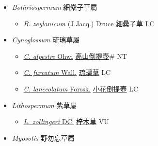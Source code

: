 
  \begin{itemize}
 \item[] \textit{Bothriospermum} 細纍子草屬
                    
  \begin{itemize}
        \item[] \href{http://www.theplantlist.org/tpl1.1/search?q=Bothriospermum+zeylanicum}{\textit{B. zeylanicum} (J.Jacq.) Druce}   \href{\detokenize{http://taibnet.sinica.edu.tw/chi/taibnet_species_list.php?T2=細纍子草&T2_new_value=true&fr=y}}{細纍子草} LC
  \end{itemize}
 \item[] \textit{Cynoglossum} 琉璃草屬
                    
  \begin{itemize}
        \item[] \href{http://www.theplantlist.org/tpl1.1/search?q=Cynoglossum+alpestre}{\textit{C. alpestre} Ohwi}   \href{\detokenize{http://taibnet.sinica.edu.tw/chi/taibnet_species_list.php?T2=高山倒提壺&T2_new_value=true&fr=y}}{高山倒提壺}\# NT
        \item[] \href{http://www.theplantlist.org/tpl1.1/search?q=Cynoglossum+furcatum}{\textit{C. furcatum} Wall.}   \href{\detokenize{http://taibnet.sinica.edu.tw/chi/taibnet_species_list.php?T2=琉璃草&T2_new_value=true&fr=y}}{琉璃草} LC
        \item[] \href{http://www.theplantlist.org/tpl1.1/search?q=Cynoglossum+lanceolatum}{\textit{C. lanceolatum} Forssk.}   \href{\detokenize{http://taibnet.sinica.edu.tw/chi/taibnet_species_list.php?T2=小花倒提壺&T2_new_value=true&fr=y}}{小花倒提壺} LC
  \end{itemize}
 \item[] \textit{Lithospermum} 紫草屬
                    
  \begin{itemize}
        \item[] \href{http://www.theplantlist.org/tpl1.1/search?q=Lithospermum+zollingeri}{\textit{L. zollingeri} DC.}   \href{\detokenize{http://taibnet.sinica.edu.tw/chi/taibnet_species_list.php?T2=梓木草&T2_new_value=true&fr=y}}{梓木草} VU
  \end{itemize}
 \item[] \textit{Myosotis} 野勿忘草屬
                    

\end{itemize}
